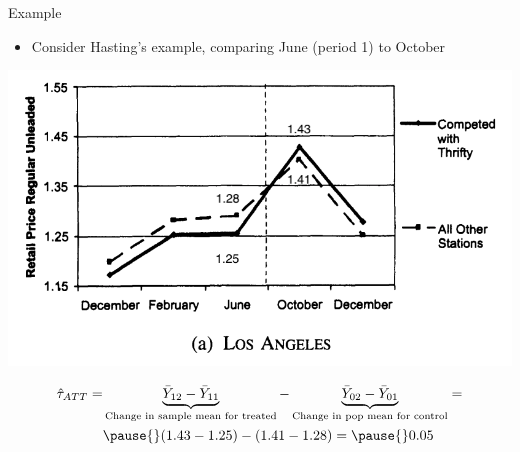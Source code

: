 \documentclass[11pt,english,handout]{beamer}
\begin{document}
\begin{frame}{Example}
	\begin{itemize}
		\item 
		Consider Hasting's example, comparing June (period 1) to October
	\end{itemize}
	\includegraphics[width =.7\linewidth]{hastings-event-study-w-labels}

\pause
		\begin{align*}
			\hat\tau_{ATT}=&  \underbrace{\bar{Y}_{12} - \bar{Y}_{11} }_{\text{Change in sample mean for treated}} - \underbrace{\bar{Y}_{02} - \bar{Y}_{01}}_{\text{Change in pop mean for control}} =\\& \pause{} (1.43 - 1.25) - (1.41 - 1.28) = \pause{} 0.05
		\end{align*} 

\end{frame}
\end{document}
